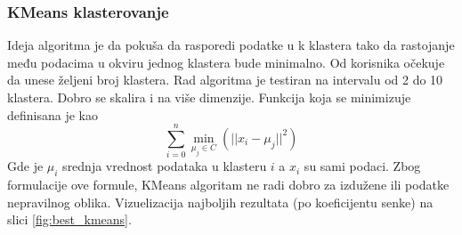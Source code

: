 \documentclass{article}
\begin{document}
\subsubsection{KMeans klasterovanje}

Ideja algoritma je da pokuša da rasporedi podatke u k klastera tako da rastojanje među podacima u okviru jednog klastera bude minimalno. Od korisnika očekuje da unese željeni broj klastera. Rad algoritma je testiran na intervalu od 2 do 10 klastera. Dobro se skalira i na više dimenzije. Funkcija koja se minimizuje definisana je kao $$\sum_{i=0}^{n}\min_{\mu_j \in C}(||x_i - \mu_j||^2)$$
Gde je $\mu_i$ srednja vrednost podataka u klasteru $i$ a $x_i$ su sami podaci. Zbog formulacije ove formule, KMeans algoritam ne radi dobro za izdužene ili podatke nepravilnog oblika. Vizuelizacija najboljih rezultata (po koeficijentu senke) na slici \ref{fig:best_kmeans}.

\begin{table}[h!]
\caption{Rezultati klasterovanja algoritmom k-sredina: najbolje se pokazalo klasterovanje datoteke GSM3308814 i to sa k = 4, i uz koriscenje euklidskog rastojanja. Vrednosti ocena najboljih klastera su slicne onima dobijenim i za louvain i leiden klasterovanja. Rezultati su vizuelno predstavljeni na slici \ref{fig:best_kmeans} }
\label{tab:kmeans-results}
\end{table}
\end{document}
